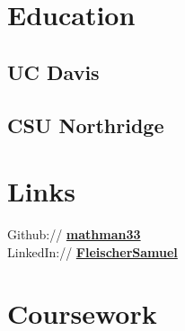 \documentclass[letterpaper]{deedy-resume} %
\begin{document}
\begin{minipage}[t]{0.33\textwidth} %


\section{Education} 

\subsection{UC Davis}


\vspace{7pt} %

\subsection{CSU Northridge}


\vspace{7pt} %


\section{Links} 

Github:// \href{https://github.com/mathman33}{\bf mathman33} \\
LinkedIn:// \href{https://www.linkedin.com/in/FleischerSamuel}{\bf FleischerSamuel} \\

\vspace{7pt} %


\section{Coursework}


\end{minipage}
\end{document}
